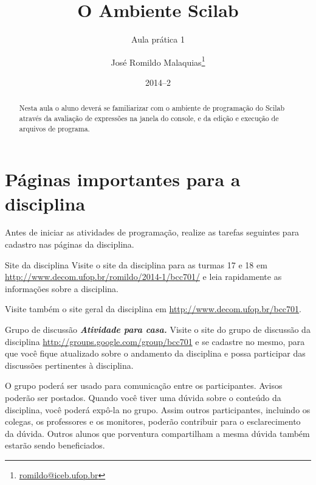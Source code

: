 \documentclass[11pt,fleqn]{practice}
\begin{document}

\subtitle{Aula prática 1}
\title{O Ambiente Scilab}
\author{José Romildo Malaquias\thanks{\url{romildo@iceb.ufop.br}}}
\date{2014--2}
\maketitle

\begin{abstract}
  Nesta aula o aluno deverá se familiarizar com o ambiente de
  programação do Scilab através da avaliação de expressões na janela do
  console, e da edição e execução de arquivos de programa.
\end{abstract}

\tableofcontents

\section{Páginas importantes para a disciplina}

Antes de iniciar as atividades de programação, realize as tarefas
seguintes para cadastro nas páginas da disciplina.

\begin{task}{Site da disciplina}{}
  Visite o site da disciplina para as turmas 17 e 18 em
  \url{http://www.decom.ufop.br/romildo/2014-1/bcc701/} e leia
  rapidamente as informações sobre a disciplina.

  Visite também o site geral da disciplina em
  \url{http://www.decom.ufop.br/bcc701}.
\end{task}

\begin{task}{Grupo de discussão}{}
  \textbf{\textit{Atividade para casa.}} Visite o site do grupo de
  discussão da disciplina \url{http://groups.google.com/group/bcc701} e
  se cadastre no mesmo, para que você fique atualizado sobre o andamento
  da disciplina e possa participar das discussões pertinentes à
  disciplina.

  O grupo poderá ser usado para comunicação entre os
  participantes. Avisos poderão ser postados. Quando você tiver uma
  dúvida sobre o conteúdo da disciplina, você poderá expô-la no
  grupo. Assim outros participantes, incluindo os colegas, os
  professores e os monitores, poderão contribuir para o esclarecimento
  da dúvida. Outros alunos que porventura compartilham a mesma dúvida
  também estarão sendo beneficiados.
\end{task}
\end{document}
